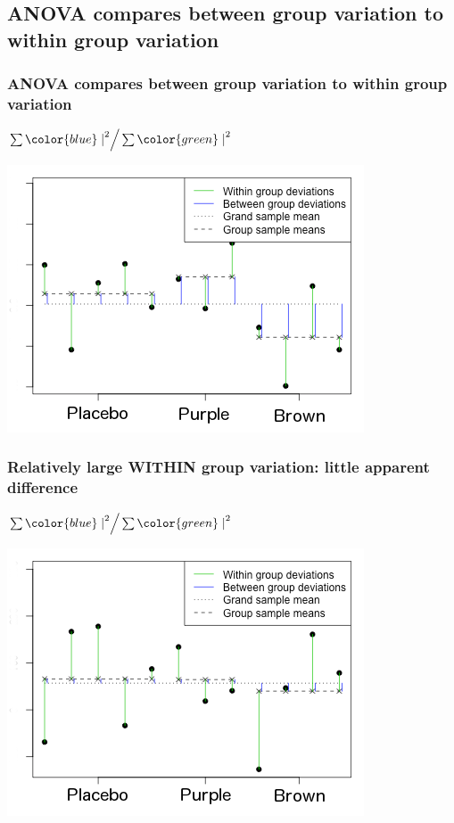 \documentclass[11pt,containsverbatim,handout,xcolor=xelatex,dvipsnames,table]{beamer}
\begin{document}

\subsection{ANOVA compares between group variation to within group variation}
\label{mi3}


\begin{frame}
  \frametitle{ANOVA compares between group variation to within group variation}

\centering
\(
\sum {\color{blue} \mid}^2 \Big/ \sum {\color{green} \mid}^2
\)

  \includegraphics[scale=0.6]{figures/anova-middle-ground-jelly-bean.png}

\end{frame}

\begin{frame}
\frametitle{Relatively large WITHIN group variation: little apparent difference}

\centering
\(
\sum {\color{blue} \mid}^2 \Big/ \sum {\color{green} \mid}^2
\)

    \includegraphics[scale=0.6]{Figures/anova-lots-of-within-group-jelly-bean.png}

\end{frame}
\end{document}
